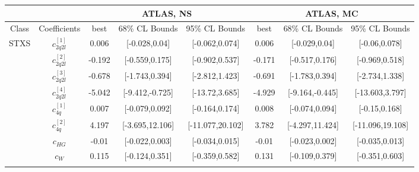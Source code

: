 \documentclass{article}
\begin{document}
\begin{table}[H]
\centering
\begin{tabular}{|c|c|c|c|c|c|c|c|}
\hline
 &  & \multicolumn{3}{c|}{ATLAS, NS} & \multicolumn{3}{c|}{ATLAS, MC} \\ \hline
Class & Coefficients & best & 68\% CL Bounds & 95\% CL Bounds & best & 68\% CL Bounds & 95\% CL Bounds\\ \hline
\multirow{28}{*}{STXS}
 & $c_{2q2l}^{[1]}$ & 0.006                             & [-0.028,0.04]                                 & [-0.062,0.074] & 0.006                             & [-0.029,0.04]                                 & [-0.06,0.078] \\ \cline{2-8}
 & $c_{2q2l}^{[2]}$ & -0.192                             & [-0.559,0.175]                                 & [-0.902,0.537] & -0.171                             & [-0.517,0.176]                                 & [-0.969,0.518] \\ \cline{2-8}
 & $c_{2q2l}^{[3]}$ & -0.678                             & [-1.743,0.394]                                 & [-2.812,1.423] & -0.691                             & [-1.783,0.394]                                 & [-2.734,1.338] \\ \cline{2-8}
 & $c_{2q2l}^{[4]}$ & -5.042                             & [-9.412,-0.725]                                 & [-13.72,3.685] & -4.929                             & [-9.164,-0.445]                                 & [-13.603,3.797] \\ \cline{2-8}
 & $c_{4q}^{[1]}$ & 0.007                             & [-0.079,0.092]                                 & [-0.164,0.174] & 0.008                             & [-0.074,0.094]                                 & [-0.15,0.168] \\ \cline{2-8}
 & $c_{4q}^{[2]}$ & 4.197                             & [-3.695,12.106]                                 & [-11.077,20.102] & 3.782                             & [-4.297,11.424]                                 & [-11.096,19.108] \\ \cline{2-8}
 & $c_{HG}$ & -0.01                             & [-0.022,0.003]                                 & [-0.034,0.015] & -0.01                             & [-0.023,0.002]                                 & [-0.035,0.013] \\ \cline{2-8}
 & $c_{W}$ & 0.115                             & [-0.124,0.351]                                 & [-0.359,0.582] & 0.131                             & [-0.109,0.379]                                 & [-0.351,0.603] \\ \cline{2-8}

\end{tabular}
\end{table}
\end{document}
